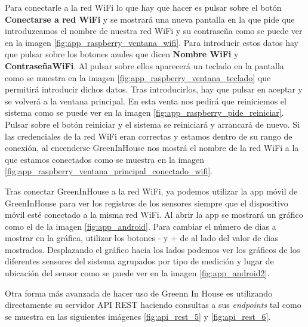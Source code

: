 Para conectarle a la red WiFi lo que hay que hacer es pulsar sobre el botón \textbf{Conectarse a red WiFi} y se mostrará una nueva pantalla en la que pide que introduzcamos el nombre de nuestra red WiFi y su contraseña como se puede ver en la imagen \ref{fig:app_raspberry_ventana_wifi}.
Para introducir estos datos hay que pulsar sobre los botones azules que dicen \textbf{Nombre WiFi} y \textbf{ContraseñaWiFi}. Al pulsar sobre ellos aparecerá un teclado en la pantalla como se muestra en la imagen \ref{fig:app_raspberry_ventana_teclado} que permitirá introducir dichos datos.
Tras introducirlos, hay que pulsar en aceptar y se volverá a la ventana principal. En esta venta nos pedirá que reiniciemos el sistema como se puede ver en la imagen \ref{fig:app_raspberry_pide_reiniciar}.
Pulsar sobre el botón reiniciar y el sistema se reiniciará y arrancará de nuevo. Si las credenciales de la red WiFi eran correctas y estamos dentro de su rango de conexión, al encenderse GreenInHouse nos mostrá el nombre de la red WiFi a la que estamos conectados como se muestra en la imagen \ref{fig:app_raspberry_ventana_principal_conectado_wifi}.

Tras conectar GreenInHouse a la red WiFi, ya podemos utilizar la app móvil de GreenInHouse para ver los registros de los sensores siempre que el dispositivo móvil esté conectado a la misma red WiFi. Al abrir la app se mostrará un gráfico como el de la imagen \ref{fig:app_android}.
Para cambiar el número de dias a mostrar en la gráfica, utilizar los botones - y + de al lado del valor de dias mostrados. Desplazando el gráfico hacia los lados podemos ver los gráficos de los diferentes sensores del sistema agrupados por tipo de medición y lugar de ubicación del sensor como se puede ver en la imagen \ref{fig:app_android2}.

Otra forma más avanzada de hacer uso de Greenn In House es utilizando directamente su servidor API REST haciendo consultas a sus \textit{endpoints} tal como se muestra en las siguientes imágenes \ref{fig:api_rest_5} y \ref{fig:api_rest_6}.


